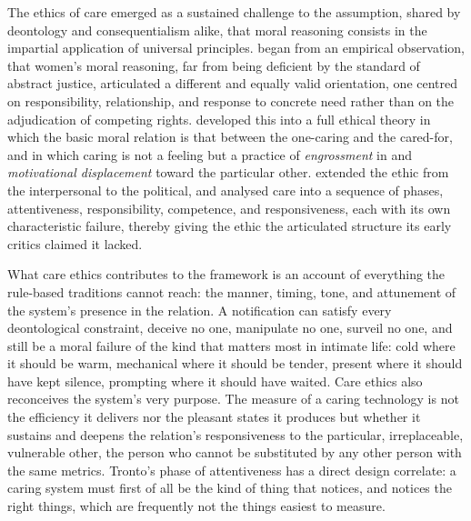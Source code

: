 \documentclass[11pt,a4paper]{article}
\begin{document}
The ethics of care emerged as a sustained challenge to the assumption, shared by deontology and consequentialism alike, that moral reasoning consists in the impartial application of universal principles. \textcite{gilligan1982voice} began from an empirical observation, that women's moral reasoning, far from being deficient by the standard of abstract justice, articulated a different and equally valid orientation, one centred on responsibility, relationship, and response to concrete need rather than on the adjudication of competing rights. \textcite{noddings1984caring} developed this into a full ethical theory in which the basic moral relation is that between the one-caring and the cared-for, and in which caring is not a feeling but a practice of \emph{engrossment} in and \emph{motivational displacement} toward the particular other. \textcite{held2006ethics} extended the ethic from the interpersonal to the political, and \textcite{tronto1993moral} analysed care into a sequence of phases, attentiveness, responsibility, competence, and responsiveness, each with its own characteristic failure, thereby giving the ethic the articulated structure its early critics claimed it lacked.

What care ethics contributes to the framework is an account of everything the rule-based traditions cannot reach: the manner, timing, tone, and attunement of the system's presence in the relation. A notification can satisfy every deontological constraint, deceive no one, manipulate no one, surveil no one, and still be a moral failure of the kind that matters most in intimate life: cold where it should be warm, mechanical where it should be tender, present where it should have kept silence, prompting where it should have waited. Care ethics also reconceives the system's very purpose. The measure of a caring technology is not the efficiency it delivers nor the pleasant states it produces but whether it sustains and deepens the relation's responsiveness to the particular, irreplaceable, vulnerable other, the person who cannot be substituted by any other person with the same metrics. Tronto's phase of attentiveness has a direct design correlate: a caring system must first of all be the kind of thing that notices, and notices the right things, which are frequently not the things easiest to measure.
\end{document}
